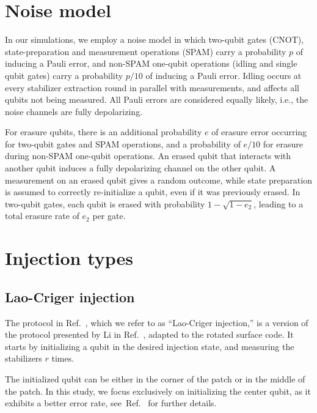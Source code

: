 \documentclass[twocolumn,
notitlepage,
aps,
prx,
floatfix,
superscriptaddress
]{revtex4-2}
\begin{document}
\appendix

\section{Noise model} \label{sec:noise-model}

In our simulations, we employ a noise model in which two-qubit gates (CNOT), state-preparation and measurement operations (SPAM) carry a probability $p$ of inducing a Pauli error, and non-SPAM one-qubit operations (idling and single qubit gates) carry a probability $p/10$ of inducing a Pauli error.
Idling occurs at every stabilizer extraction round in parallel with measurements, and affects all qubits not being measured. 
All Pauli errors are considered equally likely, i.e., the noise channels are fully depolarizing.

For erasure qubits, there is an additional probability $e$ of erasure error occurring for two-qubit gates and SPAM operations, and a probability of $e/10$ for erasure during non-SPAM one-qubit operations. 
An erased qubit that interacts with another qubit induces a fully depolarizing channel on the other qubit. A measurement on an erased qubit gives a random outcome, while state preparation is assumed to correctly re-initialize a qubit, even if it was previously erased.
In two-qubit gates, each qubit is erased with probability $1-\sqrt{1-e_2}$, leading to a total erasure rate of $e_2$ per gate.

\section{Injection types} \label{sec:injection-types}

\subsection{Lao-Criger injection}

The protocol in Ref.~\cite{lao2022magic}, which we refer to as ``Lao-Criger injection,'' is a version of the protocol presented by Li in Ref.~\cite{li2015magic},  adapted to the rotated surface code. It starts by initializing a qubit in the desired injection state, and measuring the stabilizers $r$ times.

The initialized qubit can be either in the corner of the patch or in the middle of the patch. In this study, we focus exclusively on initializing the center qubit, as it exhibits a better error rate, see~Ref.~\cite{lao2022magic} for further details.
\end{document}
